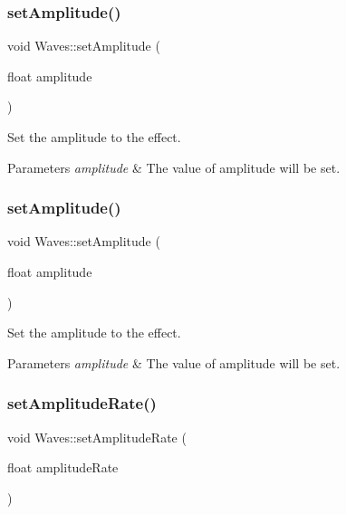 \subsubsection{\texorpdfstring{set\+Amplitude()}{setAmplitude()}\hspace{0.1cm}{\footnotesize\ttfamily [1/2]}}
{\footnotesize\ttfamily void Waves\+::set\+Amplitude (\begin{DoxyParamCaption}\item[{float}]{amplitude }\end{DoxyParamCaption})\hspace{0.3cm}{\ttfamily [inline]}}



Set the amplitude to the effect. 


\begin{DoxyParams}{Parameters}
{\em amplitude} & The value of amplitude will be set. \\
\hline
\end{DoxyParams}
\mbox{\label{classWaves_a65150f197db5932cdc1fc48fcec6fb4f}} 
\subsubsection{\texorpdfstring{set\+Amplitude()}{setAmplitude()}\hspace{0.1cm}{\footnotesize\ttfamily [2/2]}}
{\footnotesize\ttfamily void Waves\+::set\+Amplitude (\begin{DoxyParamCaption}\item[{float}]{amplitude }\end{DoxyParamCaption})\hspace{0.3cm}{\ttfamily [inline]}}



Set the amplitude to the effect. 


\begin{DoxyParams}{Parameters}
{\em amplitude} & The value of amplitude will be set. \\
\hline
\end{DoxyParams}
\mbox{\label{classWaves_abe89b564eea8d77f5e008218bcb48ccb}} 
\subsubsection{\texorpdfstring{set\+Amplitude\+Rate()}{setAmplitudeRate()}\hspace{0.1cm}{\footnotesize\ttfamily [1/2]}}
{\footnotesize\ttfamily void Waves\+::set\+Amplitude\+Rate (\begin{DoxyParamCaption}\item[{float}]{amplitude\+Rate }\end{DoxyParamCaption})\hspace{0.3cm}{\ttfamily [inline]}}



